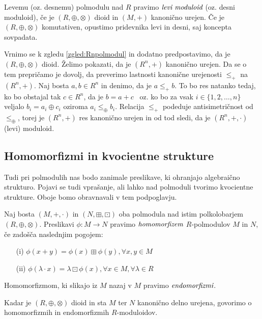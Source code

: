 \documentclass[mat1]{fmfdelo}
\newcommand{\pojem}[1]{\ensuremath{\emph{#1}}}
\newcommand{\map}[3]{\ensuremath{{#1}:{#2}\rightarrow{#3}}}
\begin{document}
\begin{definicija}
	Levemu (oz. desnemu) polmodulu nad $R$ pravimo \pojem{levi~moduloid} (oz. desni moduloid), če je $(R, \oplus, \otimes)$ dioid in $(M, +)$ kanonično urejen. Če je $(R, \oplus, \otimes)$ komutativen, opustimo pridevnika levi in desni, saj koncepta sovpadata.
\end{definicija}

\begin{zgled}
	Vrnimo se k zgledu \ref{zgled:Rnpolmodul} in dodatno predpostavimo, da je $(R, \oplus, \otimes)$ dioid. Želimo pokazati, da je $(R^n, +)$ kanonično urejen.
	Da se o tem prepričamo je dovolj, da preverimo lastnosti kanonične urejenosti $\leq_+$ na $(R^n, +)$. Naj bosta $a, b \in R^n$ in denimo, da je $a \leq_+ b$. To bo res natanko tedaj, ko bo obstajal tak $c\in R^n$, da je $b = a + c$~ oz. ko bo za vsak $i\in \{1, 2, \ldots, n\}$ veljalo $b_i = a_i \oplus c_i$ oziroma $a_i \leq_\oplus b_i$. Relacija $\leq_+$ podeduje antisimetričnost od $\leq_\oplus$, torej je $(R^n, +)$ res kanonično urejen in od tod sledi, da je $(R^n, +, \cdot)$ (levi) moduloid.
\end{zgled}

\subsection{Homomorfizmi in kvocientne strukture}\label{subsect:homomorphsemimodule}
Tudi pri polmodulih nas bodo zanimale preslikave, ki ohranjajo algebraično strukturo. Pojavi se tudi vprašanje, ali lahko nad polmoduli tvorimo kvocientne strukture. Oboje bomo obravnavali v tem podpoglavju.

\begin{definicija}
	Naj bosta $(M, +, \cdot)$ in $(N, \boxplus, \boxdot)$ oba polmodula nad istim polkolobarjem $(R, \oplus, \otimes)$. Preslikavi \map{\phi}{M}{N} pravimo \pojem{homomorfizem} $R$-polmodulov $M$ in $N$, če zadošča naslednjim pogojem: \begin{enumerate}
		\item[(i)] $\phi(x + y) = \phi(x)\boxplus\phi(y), \forall x, y\in M$
		\item[(ii)] $\phi(\lambda\cdot x) = \lambda \boxdot \phi(x), \forall x\in M, \forall \lambda\in R$
	\end{enumerate}
Homomorfizmom, ki slikajo iz $M$ nazaj v $M$ pravimo \pojem{endomorfizmi}.

Kadar je $(R, \oplus, \otimes)$ dioid in sta $M$ ter $N$ kanonično delno urejena, govorimo o homomorfizmih in endomorfizmih $R$-moduloidov.
\end{definicija}
\end{document}
